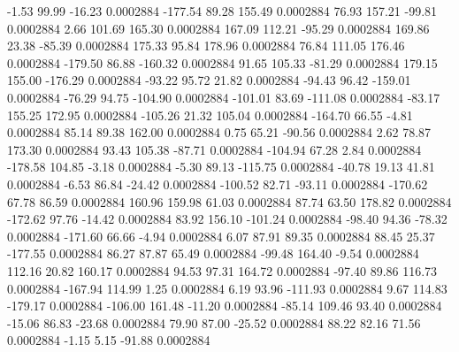        -1.53       99.99      -16.23     0.0002884
     -177.54       89.28      155.49     0.0002884
       76.93      157.21      -99.81     0.0002884
        2.66      101.69      165.30     0.0002884
      167.09      112.21      -95.29     0.0002884
      169.86       23.38      -85.39     0.0002884
      175.33       95.84      178.96     0.0002884
       76.84      111.05      176.46     0.0002884
     -179.50       86.88     -160.32     0.0002884
       91.65      105.33      -81.29     0.0002884
      179.15      155.00     -176.29     0.0002884
      -93.22       95.72       21.82     0.0002884
      -94.43       96.42     -159.01     0.0002884
      -76.29       94.75     -104.90     0.0002884
     -101.01       83.69     -111.08     0.0002884
      -83.17      155.25      172.95     0.0002884
     -105.26       21.32      105.04     0.0002884
     -164.70       66.55       -4.81     0.0002884
       85.14       89.38      162.00     0.0002884
        0.75       65.21      -90.56     0.0002884
        2.62       78.87      173.30     0.0002884
       93.43      105.38      -87.71     0.0002884
     -104.94       67.28        2.84     0.0002884
     -178.58      104.85       -3.18     0.0002884
       -5.30       89.13     -115.75     0.0002884
      -40.78       19.13       41.81     0.0002884
       -6.53       86.84      -24.42     0.0002884
     -100.52       82.71      -93.11     0.0002884
     -170.62       67.78       86.59     0.0002884
      160.96      159.98       61.03     0.0002884
       87.74       63.50      178.82     0.0002884
     -172.62       97.76      -14.42     0.0002884
       83.92      156.10     -101.24     0.0002884
      -98.40       94.36      -78.32     0.0002884
     -171.60       66.66       -4.94     0.0002884
        6.07       87.91       89.35     0.0002884
       88.45       25.37     -177.55     0.0002884
       86.27       87.87       65.49     0.0002884
      -99.48      164.40       -9.54     0.0002884
      112.16       20.82      160.17     0.0002884
       94.53       97.31      164.72     0.0002884
      -97.40       89.86      116.73     0.0002884
     -167.94      114.99        1.25     0.0002884
        6.19       93.96     -111.93     0.0002884
        9.67      114.83     -179.17     0.0002884
     -106.00      161.48      -11.20     0.0002884
      -85.14      109.46       93.40     0.0002884
      -15.06       86.83      -23.68     0.0002884
       79.90       87.00      -25.52     0.0002884
       88.22       82.16       71.56     0.0002884
       -1.15        5.15      -91.88     0.0002884
